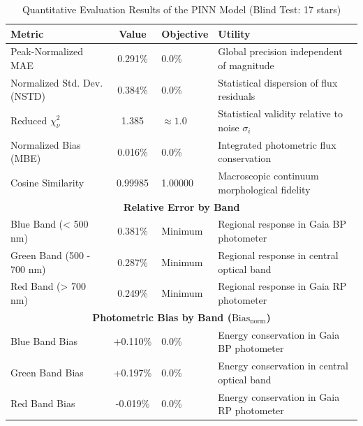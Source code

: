 
\begin{table}[htpb]
\centering
\caption{Quantitative Evaluation Results of the PINN Model (Blind Test: 17 stars)}
\label{tab:pinn_evaluation}
\begin{tabular}{lcll}
\hline
\textbf{Metric} & \textbf{Value} & \textbf{Objective} & \textbf{Utility} \\
\hline
Peak-Normalized MAE & 0.291\% & 0.0\% & Global precision independent of magnitude \\
Normalized Std. Dev. (NSTD) & 0.384\% & 0.0\% & Statistical dispersion of flux residuals \\
Reduced $\chi^2_\nu$ & 1.385 & $\approx 1.0$ & Statistical validity relative to noise $\sigma_i$ \\
Normalized Bias (MBE) & 0.016\% & 0.0\% & Integrated photometric flux conservation \\
Cosine Similarity & 0.99985 & 1.00000 & Macroscopic continuum morphological fidelity \\
\hline
\multicolumn{4}{c}{\textbf{Relative Error by Band}} \\
\hline
Blue Band (< 500 nm) & 0.381\% & Minimum & Regional response in Gaia BP photometer \\
Green Band (500 - 700 nm) & 0.287\% & Minimum & Regional response in central optical band \\
Red Band (> 700 nm) & 0.249\% & Minimum & Regional response in Gaia RP photometer \\
\hline
\multicolumn{4}{c}{\textbf{Photometric Bias by Band ($\text{Bias}_{\text{norm}}$)}} \\
\hline
Blue Band Bias & +0.110\% & 0.0\% & Energy conservation in Gaia BP photometer \\
Green Band Bias & +0.197\% & 0.0\% & Energy conservation in central optical band \\
Red Band Bias & -0.019\% & 0.0\% & Energy conservation in Gaia RP photometer \\
\hline
\end{tabular}
\end{table}
